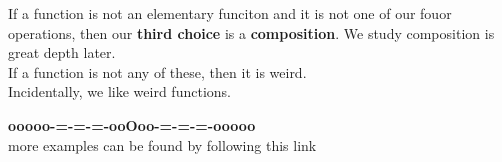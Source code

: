 \documentclass{ximera}
\begin{document}
If a function is not an elementary funciton and it is not one of our fouor operations, then our \textbf{third choice} is a \textbf{\textcolor{purple!85!blue}{composition}}.  We study composition is great depth later. \\


If a function is not any of these, then it is weird. \\

Incidentally, we like weird functions.



















\begin{center}
\textbf{\textcolor{green!50!black}{ooooo-=-=-=-ooOoo-=-=-=-ooooo}} \\

more examples can be found by following this link\\ 

\end{center}
\end{document}

